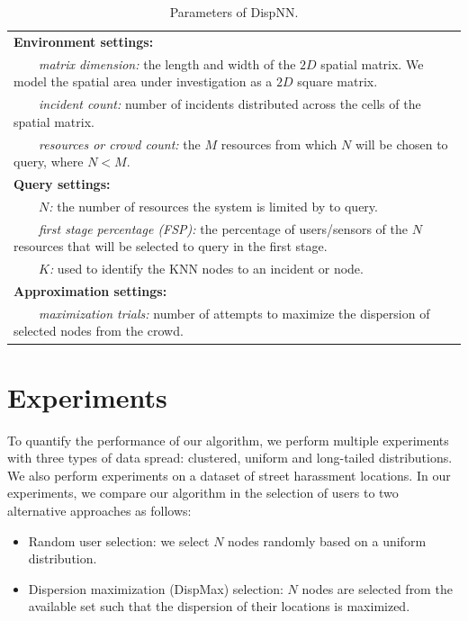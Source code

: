 \documentclass{acm_proc_article-sp}
\newcommand{\tabitem}{~~\llap{\textbullet}~~}
\begin{document}
\begin{table}{}
\centering
\begin{tabulary}{0.5\textwidth}{|L|}
\hline
\textbf{Environment settings:}\\
\tabitem \textit{matrix dimension:} the length and width of the $2D$ spatial matrix. We model the spatial area under investigation as a $2D$ square matrix.\\
\tabitem \textit{incident count:} number of incidents distributed across the cells of the spatial matrix.\\
\tabitem \textit{resources or crowd count:} the $M$ resources from which $N$ will be chosen to query, where $N < M$.\\
\hline
\textbf{Query settings:}\\
\tabitem \textit{$N$:} the number of resources the system is limited by to query.\\
\tabitem \textit{first stage percentage (FSP):} the percentage of users/sensors of the $N$ resources that will be selected to query in the first stage.\\
\tabitem\textit{$K$:} used to identify the KNN nodes to an incident or node.\\
\hline
\textbf{Approximation settings: }\\
\tabitem \textit{maximization trials:} number of attempts to maximize the dispersion of selected nodes from the crowd.\\
\hline
\end{tabulary}
\caption{Parameters of DispNN.}
\label{table:systemParameters}
\end{table}

\section{Experiments}
To quantify the performance of our algorithm, we perform multiple experiments with three types of data spread: clustered, uniform and long-tailed distributions. We also perform experiments on a dataset of street harassment locations. In our experiments, we compare our algorithm in the selection of users to two alternative approaches as follows:
\begin{itemize}
\item Random user selection: we select $N$ nodes randomly based on a uniform distribution.
\item Dispersion maximization (DispMax) selection: $N$ nodes are selected from the available set such that the dispersion of their locations is maximized.
\end{itemize}
\end{document}
